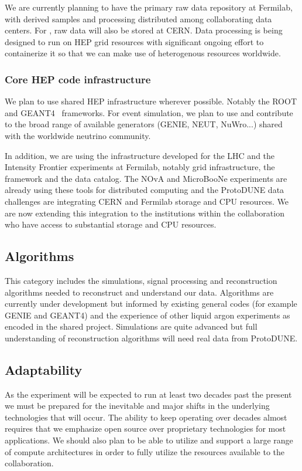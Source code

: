 We are currently planning to have the primary raw data repository at Fermilab, with derived samples and processing distributed among collaborating data centers.  For , raw data will also be stored at CERN.  Data processing is being designed to run on HEP grid resources with significant ongoing effort to containerize it so that we can make use of heterogenous resources worldwide. 


\subsubsection{Core HEP code infrastructure}
We plan to use shared HEP infrastructure wherever possible.  Notably the ROOT\cite{root} and GEANT4~\cite{geant4,Allison:2006ve} frameworks.   For event simulation, we plan to use and contribute to  the broad range of available generators (GENIE, NEUT, NuWro...) shared with the worldwide neutrino community.

In addition, we are using the infrastructure developed for the LHC and the Intensity Frontier experiments at Fermilab, notably grid infrastructure,  the  framework and the  data catalog.  The NOvA and MicroBooNe experiments are already using these tools for distributed computing and the ProtoDUNE data challenges are integrating CERN and Fermilab storage and CPU resources.  We are now extending this integration to the  institutions within the collaboration who have access to substantial storage and CPU resources. 



\subsection{Algorithms}
This category includes the simulations, signal processing and reconstruction algorithms needed to reconstruct and understand our data. Algorithms are currently under development but informed by existing general codes (for example GENIE and GEANT4) and the experience of other liquid argon experiments as encoded in the shared   project.  Simulations are quite advanced but full understanding of reconstruction algorithms will need real data from ProtoDUNE. 





\subsection{Adaptability}
As the experiment will be expected to run at least two decades past the present we must be prepared for the inevitable and major shifts in the underlying technologies that will occur. The ability to keep operating over decades almost requires that we emphasize open source over proprietary technologies for most applications.  We should also plan to be able to utilize and support a large range of compute architectures in order to fully utilize the resources available to the collaboration.

